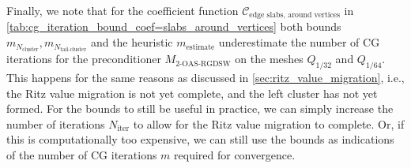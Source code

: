 Finally, we note that for the coefficient function $\mathcal{C}_{\text{edge slabs, around vertices}}$ in \cref{tab:cg_iteration_bound_coef=slabs_around_vertices} both bounds $m_{N_{\text{cluster}}}, m_{N_{\text{tail-cluster}}}$ and the heuristic $m_{\text{estimate}}$ underestimate the number of CG iterations for the preconditioner $M_{\text{2-OAS-RGDSW}}$ on the meshes $Q_{1/32}$ and $Q_{1/64}$. This happens for the same reasons as discussed in \cref{sec:ritz_value_migration}, i.e., the Ritz value migration is not yet complete, and the left cluster has not yet formed. For the bounds to still be useful in practice, we can simply increase the number of iterations $N_{\text{iter}}$ to allow for the Ritz value migration to complete. Or, if this is computationally too expensive, we can still use the bounds as indications of the number of CG iterations $m$ required for convergence. 